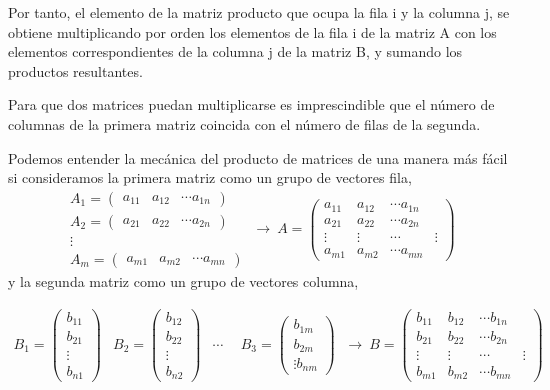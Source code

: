 Por tanto, el elemento de la matriz producto que ocupa la fila i y la columna j, se obtiene multiplicando por orden los elementos de la fila i de la matriz A con los elementos correspondientes de la columna j de la matriz B, y sumando los productos resultantes.

Para que dos matrices puedan multiplicarse es imprescindible que el número de columnas de la primera matriz coincida con el número de filas de la segunda.

Podemos entender la mecánica del producto de matrices de una manera más fácil si consideramos  la primera matriz como un grupo de vectores fila,
\begin{equation*}
\begin{aligned}
A_1=\begin{pmatrix}
a_{11}& a_{12}& \cdots a_{1n}
\end{pmatrix}\\
A_2=\begin{pmatrix}
a_{21}& a_{22}& \cdots a_{2n}
\end{pmatrix}\\
\vdots \  \ \   \  \  \  \ \ \ \ \\
A_m=\begin{pmatrix}
a_{m1}& a_{m2}& \cdots a_{mn}
\end{pmatrix}
\end{aligned} \ \rightarrow \ 
A=\begin{pmatrix}
a_{11}& a_{12}& \cdots a_{1n}\\
a_{21}& a_{22}& \cdots a_{2n}\\
\vdots& \vdots& \cdots& \vdots \\
a_{m1}& a_{m2}& \cdots a_{mn}
\end{pmatrix}
\end{equation*}
y la segunda matriz como un grupo de vectores columna,

\begin{equation*}
\begin{aligned}
B_1=\begin{pmatrix}
b_{11}\\ b_{21}\\ \vdots \\ b_{n1}
\end{pmatrix}&
B_2=\begin{pmatrix}
b_{12}\\ b_{22}\\ \vdots\\ b_{n2}
\end{pmatrix} &
\cdots  \  \  &
B_3=\begin{pmatrix}
b_{1m}\\ b_{2m}\\ \vdots  b_{nm}
\end{pmatrix}
\end{aligned} \ \rightarrow \ 
B=\begin{pmatrix}
b_{11}& b_{12}& \cdots b_{1n}\\
b_{21}& b_{22}& \cdots b_{2n}\\
\vdots& \vdots& \cdots& \vdots \\
b_{m1}& b_{m2}& \cdots b_{mn}
\end{pmatrix}
\end{equation*}

